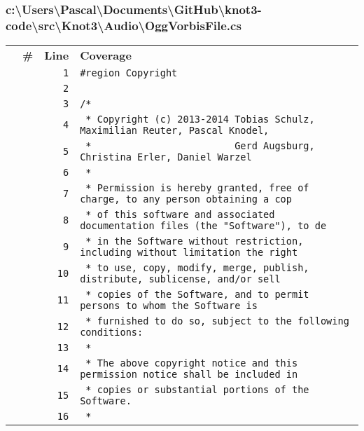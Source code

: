 \documentclass[a4paper,10pt]{article}
\begin{document}
\subsubsection{c:\textbackslash Users\textbackslash Pascal\textbackslash Documents\textbackslash GitHub\textbackslash knot3-code\textbackslash src\textbackslash Knot3\textbackslash Audio\textbackslash OggVorbisFile.cs}
\begin{longtable}[l]{lrrl}
\textbf{} & \textbf{\#} & \textbf{Line} & \textbf{Coverage}\\
\cellcolor{gray} &  & \verb~1~ & \verb~#region Copyright~\\
\cellcolor{gray} &  & \verb~2~ & \verb~~\\
\cellcolor{gray} &  & \verb~3~ & \verb~/*~\\
\cellcolor{gray} &  & \verb~4~ & \verb~ * Copyright (c) 2013-2014 Tobias Schulz, Maximilian Reuter, Pascal Knodel,~\\
\cellcolor{gray} &  & \verb~5~ & \verb~ *                         Gerd Augsburg, Christina Erler, Daniel Warzel~\\
\cellcolor{gray} &  & \verb~6~ & \verb~ *~\\
\cellcolor{gray} &  & \verb~7~ & \verb~ * Permission is hereby granted, free of charge, to any person obtaining a cop~\\
\cellcolor{gray} &  & \verb~8~ & \verb~ * of this software and associated documentation files (the "Software"), to de~\\
\cellcolor{gray} &  & \verb~9~ & \verb~ * in the Software without restriction, including without limitation the right~\\
\cellcolor{gray} &  & \verb~10~ & \verb~ * to use, copy, modify, merge, publish, distribute, sublicense, and/or sell~\\
\cellcolor{gray} &  & \verb~11~ & \verb~ * copies of the Software, and to permit persons to whom the Software is~\\
\cellcolor{gray} &  & \verb~12~ & \verb~ * furnished to do so, subject to the following conditions:~\\
\cellcolor{gray} &  & \verb~13~ & \verb~ *~\\
\cellcolor{gray} &  & \verb~14~ & \verb~ * The above copyright notice and this permission notice shall be included in ~\\
\cellcolor{gray} &  & \verb~15~ & \verb~ * copies or substantial portions of the Software.~\\
\cellcolor{gray} &  & \verb~16~ & \verb~ *~\\

\end{longtable}
\end{document}
